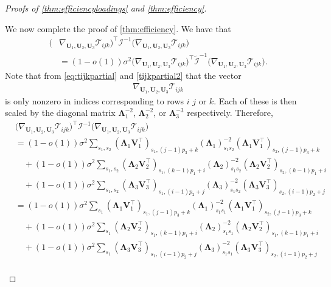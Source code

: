 \documentclass[10pt]{article}
\newcommand{\0}{{\mathbf{0}}}
\newcommand{\1}{{\mathbf{1}}}
\newcommand{\U}{{\mathbf{U}}}
\renewcommand{\t}{^{\top}}
\newcommand{\inv}{^{-1}}
\renewcommand{\tilde}{\widetilde}
\begin{document}
\begin{proof}[Proofs of \cref{thm:efficiencyloadings} and \cref{thm:efficiency}]
\begin{itemize}
 We now complete the proof of \cref{thm:efficiency}.  We have that
 \begin{align*}
    \big(  &\nabla_{\U_1,\U_2,\U_3} \mathcal{T}_{ijk} \big)\t \mathcal{I}\inv \big(  \nabla_{\U_1,\U_2,\U_3} \mathcal{T}_{ijk} \big) \\
   &= (1- o(1)) \sigma^2  \big(  \nabla_{\U_1,\U_2,\U_3} \mathcal{T}_{ijk} \big)\t \mathcal{\tilde I}\inv \big(  \nabla_{\U_1,\U_2,\U_3} \mathcal{T}_{ijk} \big).
 \end{align*}
 Note that from \eqref{eq:tijkpartial} and \eqref{tijkpartial2} that the vector
 \begin{align*}
     \nabla_{\U_1,\U_2,\U_3} \mathcal{T}_{ijk}
 \end{align*}
 is only nonzero in indices corresponding to rows $i$ $j$ or $k$.  Each of these is then scaled by the diagonal matrix $\mathbf{\Lambda}_1^{-2}$, $\mathbf{\Lambda}_2^{-2}$, or $\mathbf{\Lambda}_3^{-3}$ respectively. 
 Therefore, 
\begin{align*}
   & \big(  \nabla_{\U_1,\U_2,\U_3} \mathcal{T}_{ijk} \big)\t \mathcal{ I}\inv \big(  \nabla_{\U_1,\U_2,\U_3} \mathcal{T}_{ijk} \big) \\
    &= (1- o(1))\sigma^2 \sum_{s_1,s_2} (\mathbf{\Lambda}_1 \mathbf{V}_1\t )_{s_1,(j-1)p_3 + k} (\mathbf{\Lambda}_1)^{-2}_{s_1 s_2} (\mathbf{\Lambda}_1 \mathbf{V}_1\t )_{s_2,(j-1)p_3 + k} \\
    &\quad + (1- o(1))\sigma^2\sum_{s_1, s_2} (\mathbf{\Lambda}_2 \mathbf{V}_2\t )_{s_1,(k-1)p_1 + i} (\mathbf{\Lambda}_2)^{-2}_{s_1 s_2} (\mathbf{\Lambda}_2 \mathbf{V}_2\t )_{s_2,(k-1)p_1 + i} \\
    &\quad + (1- o(1))\sigma^2\sum_{s_1, s_2} (\mathbf{\Lambda}_3 \mathbf{V}_3\t )_{s_1,(i-1)p_2 + j} (\mathbf{\Lambda}_3)^{-2}_{s_1 s_2} (\mathbf{\Lambda}_3 \mathbf{V}_3\t )_{s_2,(i-1)p_2 + j} \\ 
    &= (1- o(1))\sigma^2\sum_{s_1} (\mathbf{\Lambda}_1 \mathbf{V}_1\t )_{s_1,(j-1)p_3 + k} (\mathbf{\Lambda}_1)^{-2}_{s_1 s_1} (\mathbf{\Lambda}_1 \mathbf{V}_1\t )_{s_2,(j-1)p_3 + k} \\
    &\quad +(1- o(1))\sigma^2 \sum_{s_1} (\mathbf{\Lambda}_2 \mathbf{V}_2\t )_{s_1,(k-1)p_1 + i} (\mathbf{\Lambda}_2)^{-2}_{s_1 s_1} (\mathbf{\Lambda}_2 \mathbf{V}_2\t )_{s_1,(k-1)p_1 + i} \\
    &\quad + (1- o(1))\sigma^2\sum_{s_1} (\mathbf{\Lambda}_3 \mathbf{V}_3\t )_{s_1,(i-1)p_2 + j} (\mathbf{\Lambda}_3)^{-2}_{s_1 s_1} (\mathbf{\Lambda}_3 \mathbf{V}_3\t )_{s_2,(i-1)p_2 + j} \\ 

\end{align*}
\end{itemize}
\end{proof}
\end{document}
